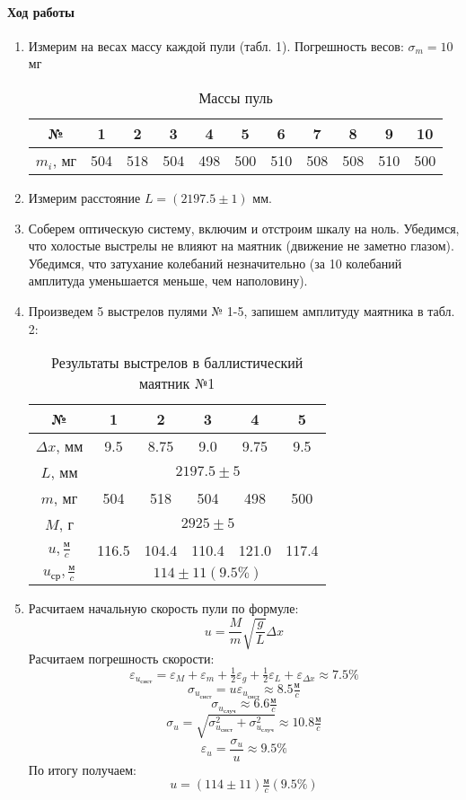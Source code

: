 \documentclass[a4paper, 10pt]{article}%
\begin{document}
	\paragraph{Ход работы}
	\begin{enumerate}
		\item Измерим на весах массу каждой пули (табл. 1). Погрешность весов: $\sigma_m = 10$ мг
		\begin{table}[h]
			\centering
			\caption{Массы пуль}
			\begin{tabular}{|c|c|c|c|c|c|c|c|c|c|c|}
				\hline
				№ & 1 & 2 & 3 & 4 & 5 & 6 & 7 & 8 & 9 & 10 \\
				\hline
				$m_i$, мг & 504 & 518 & 504 & 498 & 500 & 510 & 508 & 508 & 510 & 500 \\
				\hline
			\end{tabular}
		\end{table}
		\item Измерим расстояние $L = (2197.5 \pm 1)$ мм.
		\item Соберем оптическую систему, включим и отстроим шкалу на ноль. Убедимся, что холостые выстрелы не влияют на маятник (движение не заметно глазом). Убедимся, что затухание колебаний незначительно (за 10 колебаний амплитуда уменьшается меньше, чем наполовину).
		\item Произведем 5 выстрелов пулями № 1-5, запишем амплитуду маятника в табл. 2:
		\begin{table}[h]
			\centering
			\caption{Результаты выстрелов в баллистический маятник №1}
			\begin{tabular}{|c|c|c|c|c|c|}
				\hline
				№ & 1 & 2 & 3 & 4 & 5 \\
				\hline
				$\Delta x$, мм & 9.5 & 8.75 & 9.0 & 9.75 & 9.5 \\
				\hline
				$L$, мм & \multicolumn{5}{|c|}{$2197.5 \pm 5$} \\
				\hline
				$m$, мг & 504 & 518 & 504 & 498 & 500 \\
				\hline
				$M$, г & \multicolumn{5}{|c|}{$2925 \pm 5$} \\
				\hline
				$u, \frac{\text{м}}{c}$ & 116.5 & 104.4 & 110.4 & 121.0 & 117.4 \\
				\hline
				$u_\text{ср}, \frac{\text{м}}{c}$ & \multicolumn{5}{|c|}{$114 \pm 11 (9.5\%)$} \\
				\hline
			\end{tabular}
		\end{table}
		\item Расчитаем начальную скорость пули по формуле:
		\[u=\dfrac{M}{m}\sqrt{\dfrac{g}{L}}\Delta x\]
		Расчитаем погрешность скорости:
		\[\varepsilon_{u_\text{сист}} = \varepsilon_M + \varepsilon_m + \tfrac{1}{2}\varepsilon_g + \tfrac{1}{2}\varepsilon_L + \varepsilon_{\Delta x} \approx 7.5\%\]
		\[\sigma_{u_\text{сист}} = u\varepsilon_{u_\text{сист}} \approx 8.5 \tfrac{\text{м}}{c}\]
		\[\sigma_{u_\text{случ}} \approx 6.6 \tfrac{\text{м}}{c}\]
		\[\sigma_u = \sqrt{\sigma_{u_\text{сист}}^2+\sigma_{u_\text{случ}}^2} \approx 10.8 \tfrac{\text{м}}{c}\]
		\[\varepsilon_u = \frac{\sigma_u}{u} \approx 9.5\%\]
		По итогу получаем:
		\[u = \left(114 \pm 11\right) \tfrac{\text{м}}{c} (9.5\%)\]
		

\end{enumerate}
\end{document}

